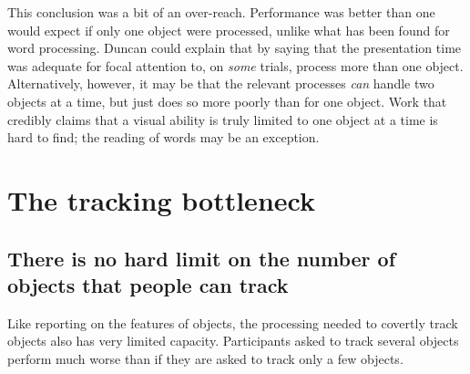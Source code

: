 \documentclass[]{book}
\begin{document}
This conclusion was a bit of an over-reach. Performance was better than one would expect if only one object were processed, unlike what has been found for word processing. Duncan could explain that by saying that the presentation time was adequate for focal attention to, on \emph{some} trials, process more than one object. Alternatively, however, it may be that the relevant processes \emph{can} handle two objects at a time, but just does so more poorly than for one object. Work that credibly claims that a visual ability is truly limited to one object at a time is hard to find; the reading of words may be an exception.

\hypertarget{the-tracking-bottleneck}{%
\section{The tracking bottleneck}\label{the-tracking-bottleneck}}

\hypertarget{there-is-no-hard-limit-on-the-number-of-objects-that-people-can-track}{%
\subsection{There is no hard limit on the number of objects that people can track}\label{there-is-no-hard-limit-on-the-number-of-objects-that-people-can-track}}

Like reporting on the features of objects, the processing needed to covertly track objects also has very limited capacity. Participants asked to track several objects perform much worse than if they are asked to track only a few objects.
\end{document}
